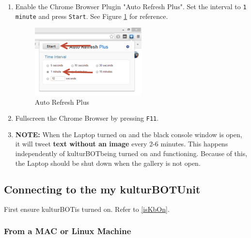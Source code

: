 \documentclass[]{article}
\newcommand{\kb}{kulturBOT}
\newcommand{\kbspace}{\kb \space}
\newcommand{\mykb}{my \kb}
\newcommand{\mykbspace}{\mykb \space}
\begin{document}
\begin{enumerate}
	\item Enable the Chrome Browser Plugin "Auto Refresh Plus". Set the interval to \texttt{1 minute} and press \texttt{Start}. See Figure \ref{autorefresh} for reference.
	
	\begin{figure}[h!]
			\centering
		    \includegraphics[width=0.55\textwidth]{img/autorefresh.png}
		    \caption{Auto Refresh Plus}
		    \label{autorefresh}
		\end{figure}
		
		\item Fullscreen the Chrome Browser by pressing \texttt{F11}.
		
		\item \textbf{NOTE:} When the Laptop turned on and the black console window is open, it will tweet \textbf{text without an image} every 2-6 minutes. This happens independently of \kbspace being turned on and functioning. Because of this, the Laptop should be shut down when the gallery is not open.
\end{enumerate}

\subsection{Connecting to the \mykbspace Unit}
\label{connect2kb}
First ensure \kbspace is turned on. Refer to \ref{isKbOn}.

\subsubsection{From a MAC or Linux Machine}
\end{document}
